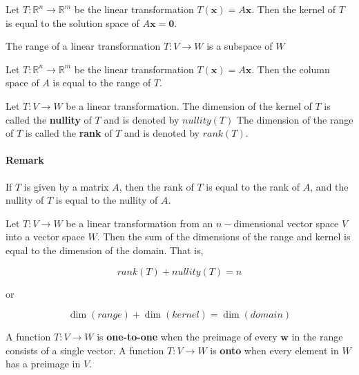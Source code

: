 \documentclass{report}
\begin{document}
\begin{tcolorbox}[title = Corollary]
	Let $T: \mathbb{R}^n \to \mathbb{R}^m$ be the linear transformation $T(\bm{x}) = A \bm{x}$. Then the kernel of $T$ is equal to the solution space of $A\bm{x} = \bm{0}$.
\end{tcolorbox}

\begin{tcolorbox}[title = The Range of $T$ is a subspace of $W$]
	The range of a linear transformation $T: V \to W$ is a subspace of $W$
\end{tcolorbox}

\begin{tcolorbox}[title = Corollary]
	Let $T: \mathbb{R}^n \to \mathbb{R}^m$ be the linear transformation $T(\bm{x}) = A \bm{x}$. Then the column space of $A$ is equal to the range of $T$.
\end{tcolorbox}

\begin{tcolorbox}[title = Definition of Rank and Nullity of a Linear Transformation]
	Let $T: V \to W$ be a linear transformation. The dimension of the kernel of $T$ is called the \textbf{nullity} of $T$ and is denoted by $nullity(T)$ The dimension of the range of $T$ is called the \textbf{rank} of $T$ and is denoted by $rank(T)$.	
	
	\paragraph{Remark} If $T$ is given by a matrix $A$, then the rank of $T$ is equal to the rank of $A$, and the nullity of $T$ is equal to the nullity of $A$.
\end{tcolorbox}

\begin{tcolorbox}[title = Sum of Rank and Nullity]
	Let $T: V \to W$ be a linear transformation from an $n-$dimensional vector space $V$ into a vector space $W$. Then the sum of the dimensions of the range and kernel is equal to the dimension of the domain.	That is,
	
	$$
	rank(T) + nullity(T) = n
	$$
	
	or 
	
	$$
	\dim (range) + \dim (kernel) = \dim (domain)
	$$
\end{tcolorbox}

\begin{tcolorbox}[title = Definition of One-to-One and Onto]
	A function $T: V \to W$ is \textbf{one-to-one} when the preimage of every $\bm{w}$ in the range consists of a single vector. A function $T: V \to W$ is \textbf{onto} when every element in $W$ has a preimage in $V$.
\end{tcolorbox}
\end{document}
